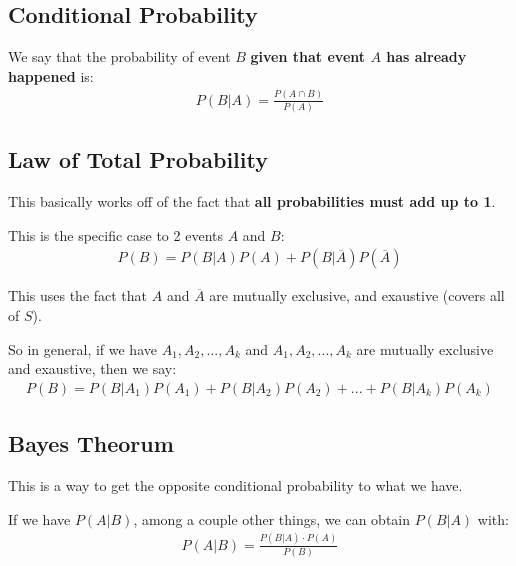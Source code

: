 \documentclass[12pt,letterpaper]{article} \usepackage{amsmath} \usepackage{graphicx} \usepackage[margin=1in]{geometry} \usepackage{longtable}  \usepackage{amssymb}
\begin{document}
	\subsection{Conditional Probability}
	We say that the probability of event $B$\textbf{ given that event $A$ has already happened} is:
	\begin{align*}
		P(B|A) = \frac{P(A\cap B)}{P(A)}
	\end{align*}
	
	\subsection{Law of Total Probability}
	This basically works off of the fact that \textbf{all probabilities must add up to 1}. 
	
	This is the specific case to 2 events $A$ and $B$:
	\begin{align*}
		P(B) = P(B|A)P(A) + P(B|\overline A)P(\overline A)
	\end{align*}

	This uses the fact that $A$ and $\overline A$ are mutually exclusive, and exaustive (covers all of $S$). 
	
	So in general, if we have $A_1, A_2, ..., A_k$ and $A_1, A_2, ..., A_k$ are mutually exclusive and exaustive, then we say:
	\begin{align*}
		P(B) = P(B|A_1)P(A_1) + P(B|A_2)P(A_2) + ... + P(B|A_k)P(A_k)
	\end{align*}
	
	\subsection{Bayes Theorum}
	This is a way to get the opposite conditional probability to what we have. 
	
	If we have $P(A|B)$, among a couple other things, we can obtain $P(B|A)$ with:
	\begin{align*}
		P(A|B) = \frac{P(B|A)\cdot P(A)}{P(B)}
	\end{align*}
	
\end{document}
